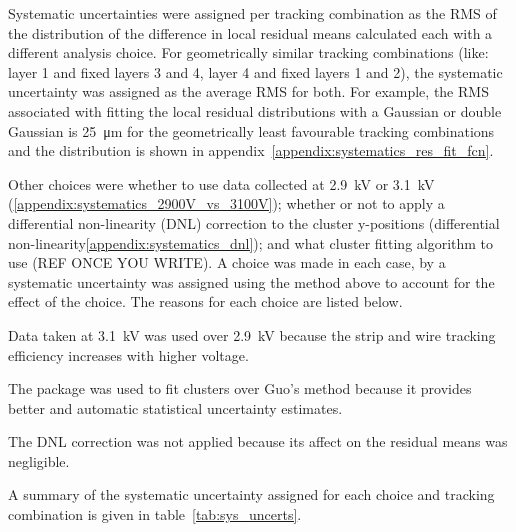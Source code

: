 Systematic uncertainties were assigned per tracking combination as the RMS of the distribution of the difference in local residual means calculated each with a different analysis choice. For geometrically similar tracking combinations (like: layer 1 and fixed layers 3 and 4, layer 4 and fixed layers 1 and 2), the systematic uncertainty was assigned as the average RMS for both. For example, the RMS associated with fitting the local residual distributions with a Gaussian or double Gaussian is \SI{25}{\micro\meter} for the geometrically least favourable tracking combinations and the distribution is shown in appendix~\ref{appendix:systematics_res_fit_fcn}.

Other choices were whether to use data collected at 2.9~kV or 3.1~kV (\ref{appendix:systematics_2900V_vs_3100V}); whether or not to apply a differential non-linearity (DNL) correction to the cluster y-positions (differential non-linearity\ref{appendix:systematics_dnl}); and what cluster fitting algorithm to use (REF ONCE YOU WRITE). A choice was made in each case, by a systematic uncertainty was assigned using the method above to account for the effect of the choice. The reasons for each choice are listed below.

Data taken at 3.1~kV was used over 2.9~kV because the strip and wire tracking efficiency increases with higher voltage.

The  package \cite{hatlo_developments_2005} was used to fit clusters over Guo's method \cite{guo_simple_2011} because it provides better and automatic statistical uncertainty estimates.

The DNL correction was not applied because its affect on the residual means was negligible.

A summary of the systematic uncertainty assigned for each choice and tracking combination is given in table~\ref{tab:sys_uncerts}.

